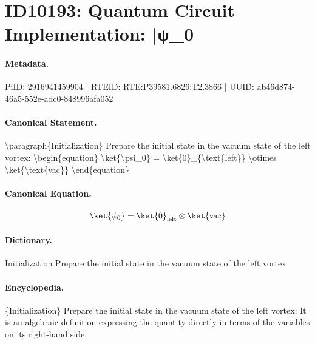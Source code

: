 \section*{ID10193: Quantum Circuit Implementation: |ψ\_0}
\paragraph{Metadata.}
PiID: 2916941459904 | RTEID: RTE:P39581.6826:T2.3866 | UUID: ab46d874-46a5-552e-adc0-848996afa052

\paragraph{Canonical Statement.}
\textbackslash{}paragraph\{Initialization\} Prepare the initial state in the vacuum state of the left vortex: \textbackslash{}begin\{equation\} \textbackslash{}ket\{\textbackslash{}psi\_0\} = \textbackslash{}ket\{0\}\_\{\textbackslash{}text\{left\}\} \textbackslash{}otimes \textbackslash{}ket\{\textbackslash{}text\{vac\}\} \textbackslash{}end\{equation\}

\paragraph{Canonical Equation.}
\[
\ket{\psi_0} = \ket{0}_{\text{left}} \otimes \ket{\text{vac}}
\]

\paragraph{Dictionary.}
Initialization Prepare the initial state in the vacuum state of the left vortex

\paragraph{Encyclopedia.}
\{Initialization\} Prepare the initial state in the vacuum state of the left vortex: It is an algebraic definition expressing the quantity directly in terms of the variables on its right-hand side.
